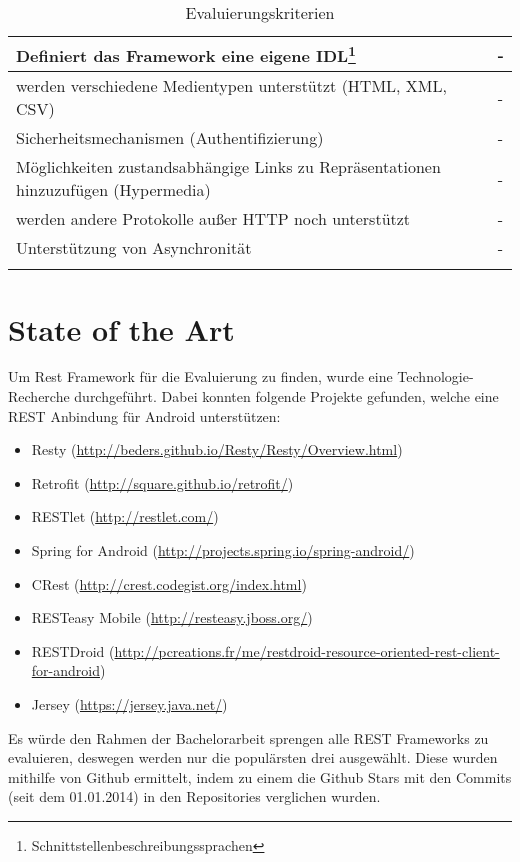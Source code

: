 \documentclass[a4paper,11pt,german,public]{INSOexpose}
\begin{document}
\begin{spacing}{1.4}
\begin{longtable}{|p{.7 \linewidth}|p{.2 \linewidth}|}
	\hline
	Definiert das Framework eine eigene IDL\footnote{Schnittstellenbeschreibungssprachen} & - \\
	\hline 
	werden verschiedene Medientypen unterstützt \newline (HTML, XML, CSV) & - \\
	\hline
	Sicherheitsmechanismen (Authentifizierung) & - \\
	\hline
	Möglichkeiten zustandsabhängige Links zu Repräsentationen hinzuzufügen (Hypermedia)& - \\
	\hline
	werden andere Protokolle außer HTTP noch unterstützt & - \\
	\hline
	Unterstützung von Asynchronität & - \\
	\hline
	\caption{Evaluierungskriterien}
	\label{tab:tabEvaluierungskriterien}
\end{longtable}
\end{spacing}
\section{State of the Art}
Um Rest Framework für die Evaluierung zu finden, wurde eine Technologie-Recherche durchgeführt. Dabei konnten folgende Projekte gefunden, welche eine REST Anbindung für Android unterstützen:
\begin{itemize}
	\item Resty (\url{http://beders.github.io/Resty/Resty/Overview.html})
	\item Retrofit (\url{http://square.github.io/retrofit/})
	\item RESTlet (\url{http://restlet.com/})
	\item Spring for Android (\url{http://projects.spring.io/spring-android/})
	\item CRest (\url{http://crest.codegist.org/index.html})
	\item RESTeasy Mobile (\url{http://resteasy.jboss.org/})
	\item RESTDroid (\url{http://pcreations.fr/me/restdroid-resource-oriented-rest-client-for-android})
	\item Jersey (\url{https://jersey.java.net/})
\end{itemize}

Es würde den Rahmen der Bachelorarbeit sprengen alle REST Frameworks zu evaluieren, deswegen werden nur die populärsten drei ausgewählt. Diese wurden mithilfe von Github ermittelt, indem zu einem die Github Stars mit den Commits (seit dem 01.01.2014) in den Repositories verglichen wurden.
\end{document}
